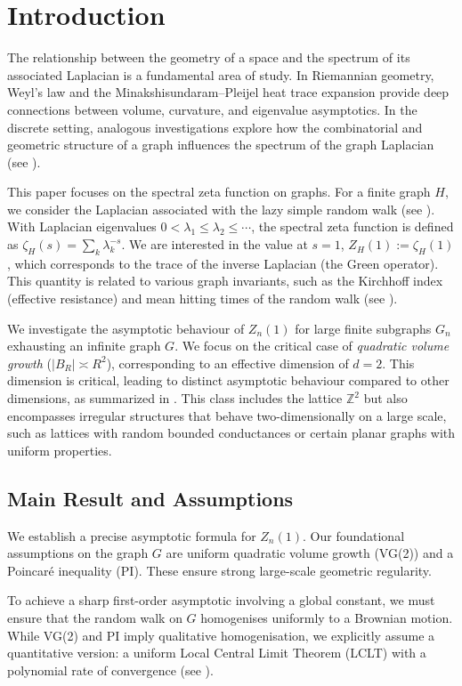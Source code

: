 \documentclass{article}
\numberwithin{equation}{section}
\theoremstyle{definition}
\theoremstyle{remark}
\begin{document}
\section{Introduction}

The relationship between the geometry of a space and the spectrum of its associated Laplacian is a fundamental area of study. In Riemannian geometry, Weyl's law and the Minakshisundaram--Pleijel heat trace expansion provide deep connections between volume, curvature, and eigenvalue asymptotics. In the discrete setting, analogous investigations explore how the combinatorial and geometric structure of a graph influences the spectrum of the graph Laplacian (see \cite{Chung97}).

This paper focuses on the spectral zeta function on graphs. For a finite graph $H$, we consider the Laplacian associated with the lazy simple random walk (see ). With Laplacian eigenvalues $0 < \lambda_1 \leq \lambda_2 \leq \cdots$, the spectral zeta function is defined as $\zeta_H(s) = \sum_k \lambda_k^{-s}$. We are interested in the value at $s=1$, $Z_H(1) := \zeta_H(1)$, which corresponds to the trace of the inverse Laplacian (the Green operator). This quantity is related to various graph invariants, such as the Kirchhoff index (effective resistance) and mean hitting times of the random walk (see \cite{LyonsPeres16}).

We investigate the asymptotic behaviour of $Z_n(1)$ for large finite subgraphs $G_n$ exhausting an infinite graph $G$. We focus on the critical case of \emph{quadratic volume growth} ($|B_R| \asymp R^2$), corresponding to an effective dimension of $d=2$. This dimension is critical, leading to distinct asymptotic behaviour compared to other dimensions, as summarized in . This class includes the lattice $\mathbb{Z}^2$ but also encompasses irregular structures that behave two-dimensionally on a large scale, such as lattices with random bounded conductances or certain planar graphs with uniform properties.

\subsection{Main Result and Assumptions}
We establish a precise asymptotic formula for $Z_n(1)$. Our foundational assumptions on the graph $G$ are uniform quadratic volume growth (VG(2)) and a Poincaré inequality (PI). These ensure strong large-scale geometric regularity.

To achieve a sharp first-order asymptotic involving a global constant, we must ensure that the random walk on $G$ homogenises uniformly to a Brownian motion. While VG(2) and PI imply qualitative homogenisation, we explicitly assume a quantitative version: a uniform Local Central Limit Theorem (LCLT) with a polynomial rate of convergence (see ).
\end{document}
